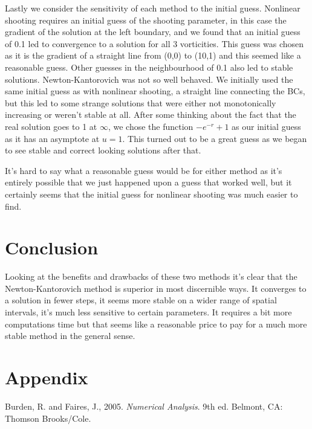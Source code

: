 \documentclass[12pt]{article}
\numberwithin{equation}{section}
\numberwithin{figure}{section}
\numberwithin{table}{section}
\begin{document}
\par Lastly we consider the sensitivity of each method to the initial guess. Nonlinear shooting requires an initial guess of the shooting parameter, in this case the gradient of the solution at the left boundary, and we found that an initial guess of 0.1 led to convergence to a solution for all 3 vorticities. This guess was chosen as it is the gradient of a straight line from (0,0) to (10,1) and this seemed like a reasonable guess. Other guesses in the neighbourhood of 0.1 also led to stable solutions. Newton-Kantorovich was not so well behaved. We initially used the same initial guess as with nonlinear shooting, a straight line connecting the BCs, but this led to some strange solutions that were either not monotonically increasing or weren't stable at all. After some thinking about the fact that the real solution goes to 1 at $\infty$, we chose the function $-e^{-r}+1$ as our initial guess as it has an asymptote at $u=1$. This turned out to be a great guess as we began to see stable and correct looking solutions after that. 
\par It's hard to say what a reasonable guess would be for either method as it's entirely possible that we just happened upon a guess that worked well, but it certainly seems that the initial guess for nonlinear shooting was much easier to find. 

\section{Conclusion}\label{sec:Conclusion}
Looking at the benefits and drawbacks of these two methods it's clear that the Newton-Kantorovich method is superior in most discernible ways. It converges to a solution in fewer steps, it seems more stable on a wider range of spatial intervals, it's much less sensitive to certain parameters. It requires a bit more computations time but that seems like a reasonable price to pay for a much more stable method in the general sense. 



\newpage
\section{Appendix}\label{sec:Appendix}
\setcounter{figure}{0} \renewcommand{\thefigure}{A.\arabic{figure}}


\begin{thebibliography}{9}
    Burden, R. and Faires, J., 2005. \textit{Numerical Analysis}. 9th ed. Belmont, CA: Thomson Brooks/Cole.
\end{thebibliography}
\end{document}
